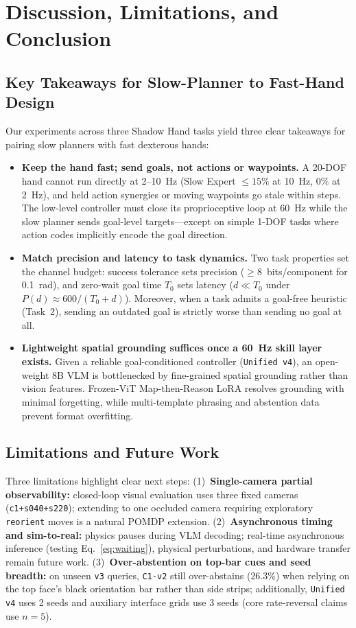 \section{Discussion, Limitations, and Conclusion}
\label{sec:conclusion}

\subsection{Key Takeaways for Slow-Planner to Fast-Hand Design}
Our experiments across three Shadow Hand tasks yield three clear takeaways for pairing slow planners with fast dexterous hands:
\begin{itemize}[leftmargin=1.5em,itemsep=1pt,topsep=1pt]
  \item \textbf{Keep the hand fast; send goals, not actions or waypoints.} A 20-DOF hand cannot run directly at 2--10~Hz (Slow Expert $\le 15\%$ at 10~Hz, $0\%$ at 2~Hz), and held action synergies or moving waypoints go stale within steps. The low-level controller must close its proprioceptive loop at 60~Hz while the slow planner sends goal-level targets---except on simple 1-DOF tasks where action codes implicitly encode the goal direction.
  \item \textbf{Match precision and latency to task dynamics.} Two task properties set the channel budget: success tolerance sets precision ($\ge 8$~bits/component for 0.1~rad), and zero-wait goal time $T_0$ sets latency ($d \ll T_0$ under $P(d)\approx 600/(T_0+d)$). Moreover, when a task admits a goal-free heuristic (Task~2), sending an outdated goal is strictly worse than sending no goal at all.
  \item \textbf{Lightweight spatial grounding suffices once a 60~Hz skill layer exists.} Given a reliable goal-conditioned controller (\texttt{Unified v4}), an open-weight 8B VLM is bottlenecked by fine-grained spatial grounding rather than vision features. Frozen-ViT Map-then-Reason LoRA resolves grounding with minimal forgetting, while multi-template phrasing and abstention data prevent format overfitting.
\end{itemize}

\subsection{Limitations and Future Work}
Three limitations highlight clear next steps:
(1)~\textbf{Single-camera partial observability:} closed-loop visual evaluation uses three fixed cameras (\texttt{c1+s040+s220}); extending to one occluded camera requiring exploratory \texttt{reorient} moves is a natural POMDP extension.
(2)~\textbf{Asynchronous timing and sim-to-real:} physics pauses during VLM decoding; real-time asynchronous inference (testing Eq.~\ref{eq:waiting}), physical perturbations, and hardware transfer remain future work.
(3)~\textbf{Over-abstention on top-bar cues and seed breadth:} on unseen \texttt{v3} queries, \texttt{C1-v2} still over-abstains (26.3\%) when relying on the top face's black orientation bar rather than side strips; additionally, \texttt{Unified v4} uses 2 seeds and auxiliary interface grids use 3 seeds (core rate-reversal claims use $n=5$).


